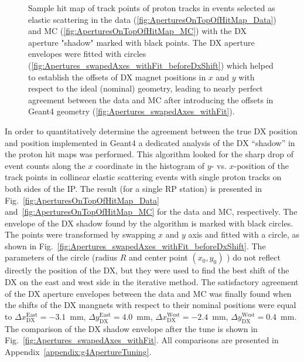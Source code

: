 \begin{figure}[b!]
{\begin{subfigure}[b]{\linewidth}
		\end{subfigure}
	}%
\caption[Sample hit map of elastically scattered protons in the data and MC with extracted envelopes of the DX apertures.]{Sample hit map of track points of proton tracks in events selected as elastic scattering in the data (\ref{fig:AperturesOnTopOfHitMap_Data}) and MC (\ref{fig:AperturesOnTopOfHitMap_MC}) with the DX aperture "shadow" marked with black points. The DX aperture envelopes were fitted with circles (\ref{fig:Apertures_swapedAxes_withFit_beforeDxShift}) which helped to establish the offsets of DX magnet positions in $x$ and $y$ with respect to the ideal (nominal) geometry, leading to nearly perfect agreement between the data and MC after introducing the offsets in Geant4 geometry (\ref{fig:Apertures_swapedAxes_withFit}).}\label{fig:aperturesWithFit_Sample}%
\end{figure}

In order to quantitatively determine the agreement between the true DX position and position implemented in Geant4 a dedicated analysis of the DX ``shadow'' in the proton hit maps was performed. This algorithm looked for the sharp drop of event counts along the $x$ coordinate in the histogram of $y$- vs. $x$-position of the track points in collinear elastic scattering events with single proton tracks on both sides of the IP. The result (for a single RP station) is presented in Fig.~\ref{fig:AperturesOnTopOfHitMap_Data} and~\ref{fig:AperturesOnTopOfHitMap_MC} for the data and MC, respectively. The envelope of the DX shadow found by the algorithm is marked with black circles. The points were transformed by swapping $x$ and $y$ axis and fitted with a circle, as shown in Fig.~\ref{fig:Apertures_swapedAxes_withFit_beforeDxShift}. The parameters of the circle (radius $R$ and center point $(x_{0}, y_{0})$ ) do not reflect directly the position of the DX, but they were used to find the best shift of the DX on the east and west side in the iterative method. The satisfactory agreement of the DX aperture envelopes between the data and MC was finally found when the shifts of the DX mangnets with respect to their nominal positions were equal to $\Delta x_{\text{DX}}^{\text{East}} = -3.1$~mm, $\Delta y_{\text{DX}}^{\text{East}} = 4.0$~mm, $\Delta x_{\text{DX}}^{\text{West}} = -2.4$~mm, $\Delta y_{\text{DX}}^{\text{West}} = 0.4$~mm. The comparison of the DX shadow envelope after the tune is shown in Fig.~\ref{fig:Apertures_swapedAxes_withFit}. All comparisons are presented in Appendix~\ref{appendix:g4ApertureTuning}.

